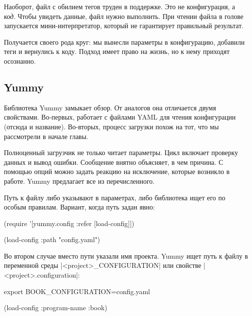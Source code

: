 Наоборот, файл с обилием тегов труден в поддержке. Это не конфигурация,
а \emph{код}. Чтобы увидеть данные, файл нужно выполнить. При чтении
файла в голове запускается мини-интерпретатор, который не гарантирует
правильный результат.

Получается своего рода круг: мы вынесли параметры в конфигурацию, добавили теги
и вернулись к коду. Подход имеет право на жизнь, но к нему приходят осознанно.

\subsection{Yummy}

Библиотека Yummy замыкает обзор. От
аналогов она отличается двумя свойствами. Во-первых, работает с файлами YAML для
чтения конфигурации (отсюда и название). Во-вторых, процесс загрузки похож на
тот, что мы рассмотрели в начале главы.

Полноценный загрузчик не только читает параметры. Цикл включает проверку данных
и вывод ошибки. Сообщение внятно объясняет, в чем причина. С помощью опций можно
задать реакцию на исключение, которые возникло в работе. Yummy предлагает все из
перечисленного.

Путь к файлу либо указывают в параметрах, либо библиотека ищет его по особым
правилам. Вариант, когда путь задан явно:

\begin{english}
  \begin{clojure}
(require '[yummy.config :refer [load-config]])

(load-config {:path "config.yaml"})
  \end{clojure}
\end{english}

Во втором случае вместо пути указали имя проекта. Yummy ищет путь к файлу в
переменной среды \spverb|<project>_CONFIGURATION| или свойстве
\spverb|<project>.configuration|:

\begin{english}
  \begin{bash}
export BOOK_CONFIGURATION=config.yaml
  \end{bash}
\end{english}

\begin{english}
  \begin{clojure}
(load-config {:program-name :book})
  \end{clojure}
\end{english}

